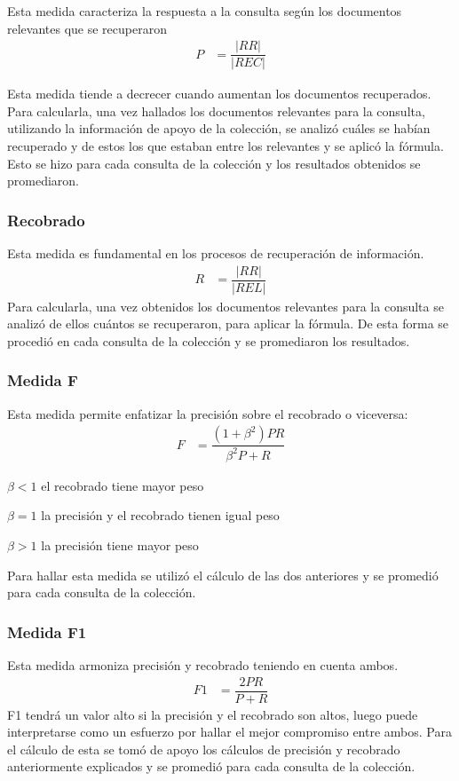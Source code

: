 \documentclass[runningheads]{llncs}
\begin{document}
	Esta medida caracteriza la respuesta a la consulta seg\'un los documentos relevantes que se recuperaron
	\begin{align*}
	P&=\dfrac{|RR|}{|REC|}
	\end{align*}
	
	Esta medida tiende a decrecer cuando aumentan los documentos recuperados. Para calcularla, una vez hallados los documentos relevantes para la consulta, utilizando la informaci\'on de apoyo de la colecci\'on, se analiz\'o cu\'ales se hab\'ian recuperado y de estos los que estaban entre los relevantes y se aplic\'o la f\'ormula. Esto  se hizo para cada consulta de la colecci\'on y los resultados obtenidos se promediaron. 

\subsubsection{Recobrado}

Esta medida es fundamental en los procesos de recuperaci\'on de informaci\'on.
	\begin{align*}
	R&=\dfrac{|RR|}{|REL|}
	\end{align*}
	Para calcularla, una vez obtenidos los documentos relevantes para la consulta se analiz\'o de ellos cu\'antos se recuperaron, para aplicar la f\'ormula. De esta forma se procedi\'o en cada consulta de la colecci\'on y se promediaron los resultados.
\subsubsection{Medida F}

Esta medida permite enfatizar la precisi\'on sobre el recobrado o viceversa:
	\begin{align*}
	F&=\dfrac{(1+ \beta^{2})PR}{\beta^{2} P + R}
	\end{align*}
	
$ \beta < 1 $ el recobrado tiene mayor peso

$ \beta = 1 $ la precisi\'on y el recobrado tienen igual peso

$ \beta > 1 $ la precisi\'on tiene mayor peso

Para hallar esta medida se utiliz\'o el c\'alculo de las dos anteriores  y se promedi\'o para cada consulta de la colecci\'on.
\subsubsection{Medida F1}
Esta medida armoniza precisi\'on y recobrado teniendo en cuenta ambos.
	\begin{align*}
	F1&=\dfrac{2PR}{P + R}
	\end{align*}
	F1 tendr\'a un valor alto si la precisi\'on y el recobrado son altos, luego puede interpretarse como un esfuerzo por hallar el mejor compromiso entre ambos. Para el c\'alculo de esta se tom\'o de apoyo los c\'alculos de precisi\'on y recobrado anteriormente explicados y se promedi\'o para cada consulta de la colecci\'on.
	
\end{document}
